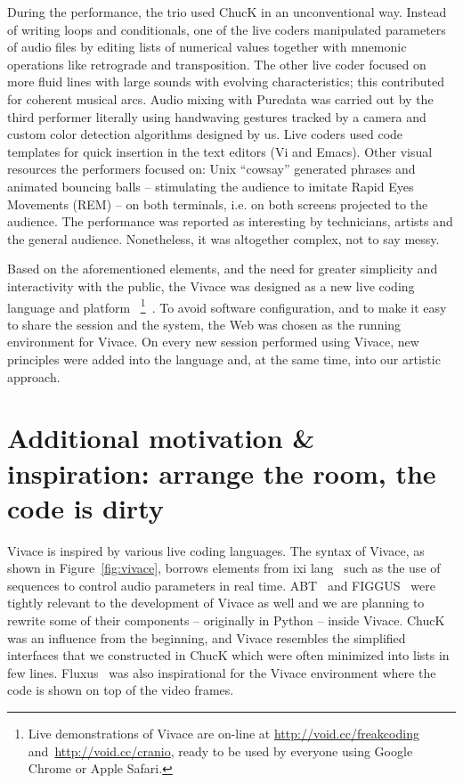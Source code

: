 \documentclass[12pt,times,twocolumn]{article}
\begin{document}
During the performance, the trio used ChucK in an unconventional
way. Instead of writing loops and conditionals, one of the live coders
manipulated parameters of audio files by editing lists of numerical
values together with mnemonic operations like retrograde and
transposition. The other live coder focused on more fluid lines with
large sounds with evolving characteristics; this contributed for coherent
musical arcs. Audio mixing with Puredata was carried out by
the third performer literally using handwaving gestures tracked by a
camera and custom color detection algorithms designed by us. Live coders
used code templates for quick insertion in the text editors (Vi
and Emacs).
Other visual resources the performers focused on:
Unix ``cowsay'' generated phrases and animated bouncing balls
-- stimulating the audience to imitate Rapid Eyes
Movements (REM) -- on both terminals, i.e. on both screens projected to the audience.
The performance was reported as interesting by technicians,
artists and the general audience.
Nonetheless, it was altogether complex, not to say messy.

Based on the aforementioned elements, and the need for greater simplicity
and interactivity with the public, the Vivace was designed as a new live coding language and platform
~\footnote{Live demonstrations of Vivace are on-line at
    \url{http://void.cc/freakcoding} and~\url{http://void.cc/cranio},
    ready to be used by everyone using
  Google Chrome or Apple Safari.}~\cite{Vivace}. To avoid software
configuration, and to make it easy to share the session and the
system, the Web was chosen as the running
environment for Vivace. On every new session performed using Vivace,
new principles were added into the language and, at the same time,
into our artistic approach.

\section{Additional motivation \& inspiration: arrange the room, the code is dirty}
Vivace is inspired by various live coding languages. The syntax of
Vivace, as shown in Figure~\ref{fig:vivace}, borrows elements from ixi
lang~\cite{magnusson2011ixi} such as the use of sequences to control
audio parameters in real time. ABT~\cite{fabbri} and
FIGGUS~\cite{fabbri2} were tightly relevant to the development of
Vivace as well and we are planning to rewrite some of their components
-- originally in Python -- inside Vivace.
ChucK was an influence from the beginning, and Vivace resembles the simplified
interfaces that we constructed in ChucK which were often minimized into lists in few lines.
Fluxus~\cite{fluxus} was also inspirational for the Vivace
environment where the code is shown on top of the video frames.
\end{document}
